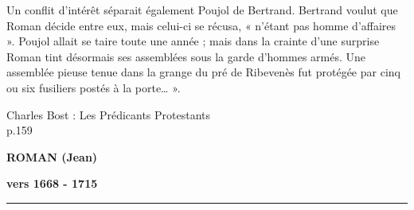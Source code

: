 \begin{tcolorbox}[
  colback=white,
  colframe=black,
  boxrule=0.7pt,
  arc=0pt,
  left=0.20cm,
  right=0.20cm,
  top=0.10cm,
  bottom=0.10cm,
  boxsep=0pt
]
Un conflit d’intérêt séparait également Poujol de Bertrand. Bertrand voulut que Roman décide entre eux, mais celui-ci se récusa, « n’étant pas homme d’affaires ». Poujol allait se taire toute une année ; mais dans la crainte d’une surprise Roman tint désormais ses assemblées sous la garde d’hommes armés. Une assemblée pieuse tenue dans la grange du pré de Ribevenès fut protégée par cinq ou six fusiliers postés à la porte… ».

\begin{flushright}
Charles Bost : Les Prédicants Protestants\\[-0.1em]
{\scriptsize p.159}
\end{flushright}

\end{tcolorbox}

\newpage



\begin{center}
  {\fontsize{12}{13}\selectfont\bfseries ROMAN (Jean)\par}
  {\fontsize{12}{13}\selectfont\bfseries vers 1668 - 1715\par}
  \vspace{0.10em}
  \rule{3.8cm}{0.45pt}
\end{center}

\vspace{0.45em}

